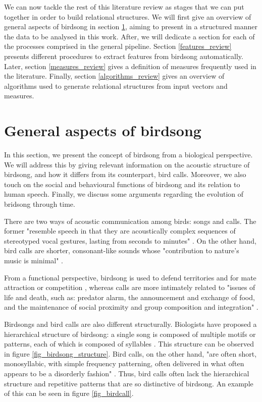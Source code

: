 \documentclass[../main.tex]{subfiles}
\begin{document}
\par We can now tackle the rest of this literature review as stages that we can put together in order to build relational structures. We will first give an overview of general aspects of birdsong in section \ref{birdsong_review}, aiming to present in a structured manner the data to be analysed in this work. After, we will dedicate a section for each of the processes comprised in the general pipeline. Section \ref{features_review} presents different procedures to extract features from birdsong automatically. Later, section \ref{measures_review} gives a definition of measures frequently used in the literature. Finally, section \ref{algorithms_review} gives an overview of algorithms used to generate relational structures from input vectors and measures.

\section{General aspects of birdsong} \label{birdsong_review}
In this section, we present the concept of birdsong from a biological perspective. We will address this by giving relevant information on the acoustic structure of birdsong, and how it differs from its counterpart, bird calls. Moreover, we also touch on the social and behavioural functions of birdsong and its relation to human speech. Finally, we discuss some arguments regarding the evolution of bridsong through time.
\par There are two ways of acoustic communication among birds: songs and calls. The former "resemble speech in that they are acoustically complex sequences of stereotyped vocal gestures, lasting from seconds to minutes" \cite{Snowdon2013}. On the other hand, bird calls are shorter, consonant-like sounds whose "contribution to nature's music is minimal" \cite{Marler2004}. 
\par From a functional perspective, birdsong is used to defend territories and for mate attraction or competition \cite{Berwick2013} \cite{Naguib2014}, whereas calls are more intimately related to "issues of life and death, such as: predator alarm, the announcement and exchange of food, and the maintenance of social proximity and group composition and integration" \cite{Marler2004}.
\par Birdsongs and bird calls are also different structurally. Biologists have proposed a hierarchical structure of birdsong: a single song is composed of multiple motifs or patterns, each of which is composed of syllables \cite{Snowdon2013}. This structure can be observed in figure \ref{fig_birdsong_structure}. Bird calls, on the other hand, "are often short, monosyllabic, with simple frequency patterning, often delivered in what often appears to be a disorderly fashion" \cite{Marler2004}. Thus, bird calls often lack the hierarchical structure and repetitive patterns that are so distinctive of birdsong. An example of this can be seen in figure \ref{fig_birdcall}.
\end{document}
